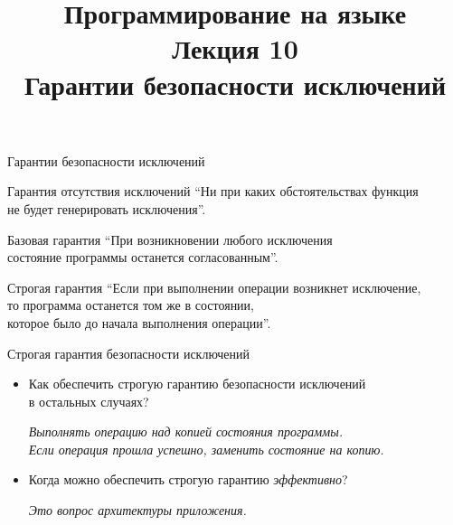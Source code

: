 \documentclass[aspectration=1610,t]{beamer}
\title{{\bf Программирование на языке \langcpp\protect\\Лекция
10\protect\vspace{1em}\\}Гарантии безопасности исключений}
\begin{document}
\begin{frame} 
  \titlepage
\end{frame}

\begin{frame}[fragile]{Гарантии безопасности исключений}
    \begin{block}{Гарантия отсутствия исключений}
            “Ни при каких обстоятельствах функция\\ не будет генерировать исключения”.
    \end{block}\pause
    
    \begin{block}{Базовая гарантия}
            “При возникновении любого исключения\\
            состояние программы останется
            согласованным”.
    \end{block}\pause

    \begin{block}{Строгая гарантия}
            “Если при выполнении операции возникнет исключение,\\ 
            то программа останется том же в состоянии, \\которое было до начала выполнения
            операции”.
    \end{block}
\end{frame}
\begin{frame}[fragile]{Строгая гарантия безопасности исключений}
    \begin{itemize}
        \pitem В каком случае мы не можем обеспечить строгую 
        гарантию безопасности исключений?
            
            \pause \medskip
            \emph{При наличии взаимодействия со внешним окружением.}
            \medskip\pause
        
        \item Как обеспечить строгую гарантию безопасности исключений\\ в остальных случаях?
            
            \pause \medskip
            \emph{Выполнять операцию над копией состояния программы.\\ Если операция прошла успешно, заменить состояние на копию.}
            \medskip\pause
            
        \item Когда можно обеспечить строгую гарантию {\em эффективно}?
        
            \pause \medskip
            \emph{Это вопрос архитектуры приложения.}
            
    \end{itemize}
\end{frame}
\end{document}
